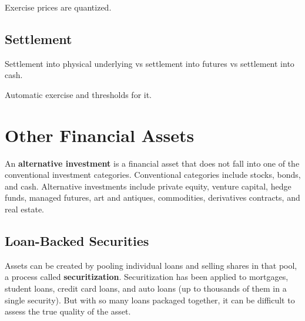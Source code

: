\documentclass{article}
\begin{document}
      Exercise prices are quantized. 

  \subsection{Settlement}

    Settlement into physical underlying vs settlement into futures vs settlement into cash. 

    Automatic exercise and thresholds for it. 

\section{Other Financial Assets}

  \begin{definition}
    An \textbf{alternative investment} is a financial asset that does not fall into one of the conventional investment categories. Conventional categories include stocks, bonds, and cash. Alternative investments include private equity, venture capital, hedge funds, managed futures, art and antiques, commodities, derivatives contracts, and real estate. 
  \end{definition}

  \subsection{Loan-Backed Securities}

    \begin{definition}[Securitization]
      Assets can be created by pooling individual loans and selling shares in that pool, a process called \textbf{securitization}. Securitization has been applied to mortgages, student loans, credit card loans, and auto loans (up to thousands of them in a single security). But with so many loans packaged together, it can be difficult to assess the true quality of the asset. 
    \end{definition}
\end{document}
